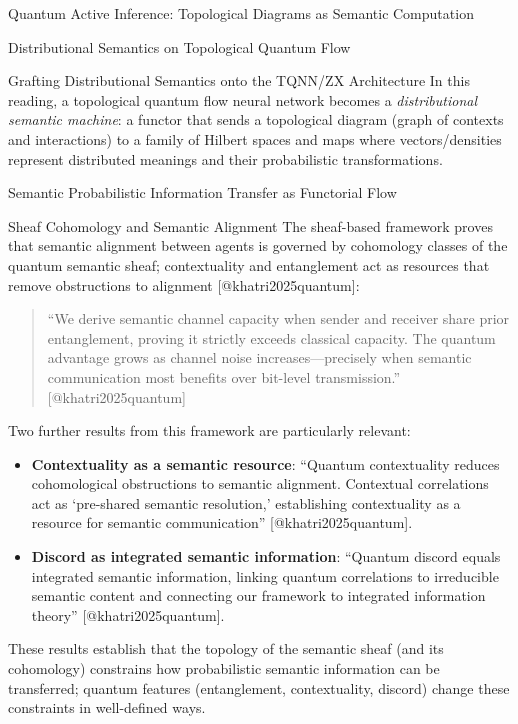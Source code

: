 \documentclass[
  ignorenonframetext,
]{beamer}
\providecommand{\tightlist}{%
  \setlength{\itemsep}{0pt}\setlength{\parskip}{0pt}}
\begin{document}
\begin{frame}{Quantum Active Inference: Topological Diagrams as Semantic
Computation}
\begin{block}{Distributional Semantics on Topological Quantum Flow}
\begin{block}{Grafting Distributional Semantics onto the TQNN/ZX
Architecture}
In this reading, a topological quantum flow neural network becomes a
\emph{distributional semantic machine}: a functor that sends a
topological diagram (graph of contexts and interactions) to a family of
Hilbert spaces and maps where vectors/densities represent distributed
meanings and their probabilistic transformations.
\end{block}
\end{block}

\begin{block}{Semantic Probabilistic Information Transfer as Functorial
Flow}
\protect{}\label{semantic-probabilistic-information-transfer-as-functorial-flow}
\begin{block}{Sheaf Cohomology and Semantic Alignment}
\protect{}\label{sheaf-cohomology-and-semantic-alignment}
The sheaf-based framework proves that semantic alignment between agents
is governed by cohomology classes of the quantum semantic sheaf;
contextuality and entanglement act as resources that remove obstructions
to alignment {[}@khatri2025quantum{]}:

\begin{quote}
``We derive semantic channel capacity when sender and receiver share
prior entanglement, proving it strictly exceeds classical capacity. The
quantum advantage grows as channel noise increases---precisely when
semantic communication most benefits over bit-level transmission.''
{[}@khatri2025quantum{]}
\end{quote}

Two further results from this framework are particularly relevant:

\begin{itemize}
\tightlist
\item
  \textbf{Contextuality as a semantic resource}: ``Quantum contextuality
  reduces cohomological obstructions to semantic alignment. Contextual
  correlations act as `pre-shared semantic resolution,' establishing
  contextuality as a resource for semantic communication''
  {[}@khatri2025quantum{]}.
\item
  \textbf{Discord as integrated semantic information}: ``Quantum discord
  equals integrated semantic information, linking quantum correlations
  to irreducible semantic content and connecting our framework to
  integrated information theory'' {[}@khatri2025quantum{]}.
\end{itemize}

These results establish that the topology of the semantic sheaf (and its
cohomology) constrains how probabilistic semantic information can be
transferred; quantum features (entanglement, contextuality, discord)
change these constraints in well-defined ways.
\end{block}


\end{block}
\end{frame}
\end{document}

